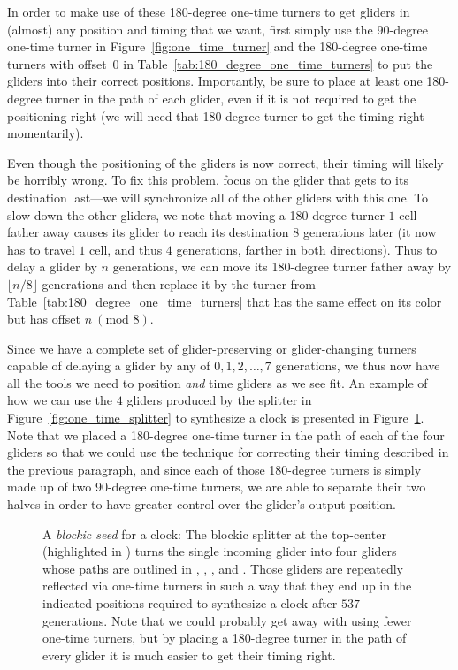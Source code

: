 In order to make use of these 180-degree one-time turners to get gliders in (almost) any position and timing that we want, first simply use the 90-degree one-time turner in Figure~\ref{fig:one_time_turner} and the 180-degree one-time turners with offset~0 in Table~\ref{tab:180_degree_one_time_turners} to put the gliders into their correct positions. Importantly, be sure to place at least one 180-degree turner in the path of each glider, even if it is not required to get the positioning right (we will need that 180-degree turner to get the timing right momentarily).

Even though the positioning of the gliders is now correct, their timing will likely be horribly wrong. To fix this problem, focus on the glider that gets to its destination last---we will synchronize all of the other gliders with this one. To slow down the other gliders, we note that moving a 180-degree turner $1$ cell father away causes its glider to reach its destination $8$ generations later (it now has to travel $1$ cell, and thus $4$ generations, farther in both directions). Thus to delay a glider by $n$ generations, we can move its 180-degree turner father away by $\lfloor n/8 \rfloor$ generations and then replace it by the turner from Table~\ref{tab:180_degree_one_time_turners} that has the same effect on its color but has offset $n \ (\text{mod } 8)$.

Since we have a complete set of glider-preserving or glider-changing turners capable of delaying a glider by any of $0,1,2,\ldots,7$ generations, we thus now have all the tools we need to position \emph{and} time gliders as we see fit. An example of how we can use the $4$ gliders produced by the splitter in Figure~\ref{fig:one_time_splitter} to synthesize a clock is presented in Figure~\ref{fig:clock_slow_salvo}. Note that we placed a 180-degree one-time turner in the path of each of the four gliders so that we could use the technique for correcting their timing described in the previous paragraph, and since each of those 180-degree turners is simply made up of two 90-degree one-time turners, we are able to separate their two halves in order to have greater control over the glider's output position.

\begin{figure}[!ht]
	\centering
	\caption{A \emph{blockic seed} for a clock: The blockic splitter at the top-center (highlighted in ) turns the single incoming glider into four gliders whose paths are outlined in , , , and . Those gliders are repeatedly reflected via one-time turners in such a way that they end up in the indicated positions required to synthesize a clock after $537$ generations. Note that we could probably get away with using fewer one-time turners, but by placing a 180-degree turner in the path of every glider it is much easier to get their timing right.}
	\label{fig:clock_slow_salvo}
\end{figure}

